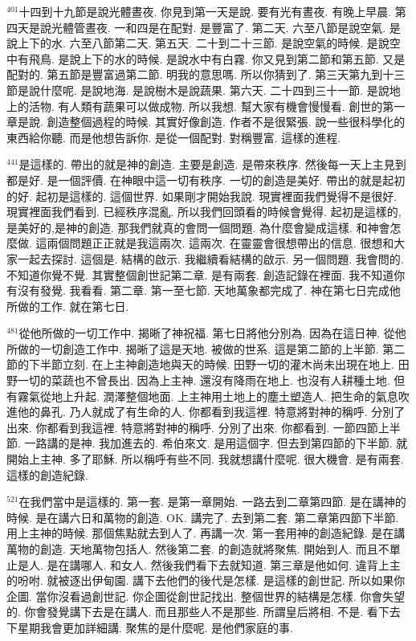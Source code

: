 \documentclass{book}
\begin{document}
$^{401}$十四到十九節是說光體晝夜.
你見到第一天是說.
要有光有晝夜.
有晚上早晨.
第四天是說光體管晝夜.
一和四是在配對.
是豐富了.
第二天.
六至八節是說空氣.
是說上下的水.
六至八節第二天.
第五天.
二十到二十三節.
是說空氣的時候.
是說空中有飛鳥.
是說上下的水的時候.
是說水中有白霧.
你又見到第二節和第五節.
又是配對的.
第五節是豐富過第二節.
明我的意思嗎.
所以你猜到了.
第三天第九到十三節是說什麼呢.
是說地海.
是說樹木是說蔬果.
第六天.
二十四到三十一節.
是說地上的活物.
有人類有蔬果可以做成物.
所以我想.
幫大家有機會慢慢看.
創世的第一章是說.
創造整個過程的時候.
其實好像創造.
作者不是很緊張.
說一些很科學化的東西給你聽.
而是他想告訴你.
是從一個配對.
對稱豐富.
這樣的進程.

$^{441}$是這樣的.
帶出的就是神的創造.
主要是創造.
是帶來秩序.
然後每一天上主見到都是好.
是一個評價.
在神眼中這一切有秩序.
一切的創造是美好.
帶出的就是起初的好.
起初是這樣的.
這個世界.
如果剛才開始我說.
現實裡面我們覺得不是很好.
現實裡面我們看到.
已經秩序混亂.
所以我們回頭看的時候會覺得.
起初是這樣的,是美好的,是神的創造.
那我們就真的會問一個問題.
為什麼會變成這樣.
和神會怎麼做.
這兩個問題正正就是我這兩次.
這兩次.
在靈靈會很想帶出的信息.
很想和大家一起去探討.
這個是.
結構的啟示.
我繼續看結構的啟示.
另一個問題.
我會問的.
不知道你覺不覺.
其實整個創世記第二章.
是有兩套.
創造記錄在裡面.
我不知道你有沒有發覺.
我看看.
第二章.
第一至七節.
天地萬象都完成了.
神在第七日完成他所做的工作.
就在第七日.

$^{481}$從他所做的一切工作中.
揭晰了神祝福.
第七日將他分別為.
因為在這日神.
從他所做的一切創造工作中.
揭晰了這是天地.
被做的世系.
這是第二節的上半節.
第二節的下半節立刻.
在上主神創造地與天的時候.
田野一切的灌木尚未出現在地上.
田野一切的菜蔬也不曾長出.
因為上主神.
還沒有降雨在地上.
也沒有人耕種土地.
但有霧氣從地上升起.
潤澤整個地面.
上主神用土地上的塵土塑造人.
把生命的氣息吹進他的鼻孔.
乃人就成了有生命的人.
你都看到我這裡.
特意將對神的稱呼.
分別了出來.
你都看到我這裡.
特意將對神的稱呼.
分別了出來.
你都看到.
一節四節上半節.
一路講的是神.
我加進去的.
希伯來文.
是用這個字.
但去到第四節的下半節.
就開始上主神.
多了耶穌.
所以稱呼有些不同.
我就想講什麼呢.
很大機會.
是有兩套.
這樣的創造紀錄.

$^{521}$在我們當中是這樣的.
第一套.
是第一章開始.
一路去到二章第四節.
是在講神的時候.
是在講六日和萬物的創造.
OK.
講完了.
去到第二套.
第二章第四節下半節.
用上主神的時候.
那個焦點就去到人了.
再講一次.
第一套用神的創造紀錄.
是在講萬物的創造.
天地萬物包括人.
然後第二套.
的創造就將聚焦.
開始到人.
而且不單止是人.
是在講哪人.
和女人.
然後我們看下去就知道.
第三章是他如何.
違背上主的吩咐.
就被逐出伊甸園.
講下去他們的後代是怎樣.
是這樣的創世記.
所以如果你企圖.
當你沒看過創世記.
你企圖從創世記找出.
整個世界的結構是怎樣.
你會失望的.
你會發覺講下去是在講人.
而且那些人不是那些.
所謂皇后將相.
不是.
看下去下星期我會更加詳細講.
聚焦的是什麼呢.
是他們家庭的事.
\end{document}
